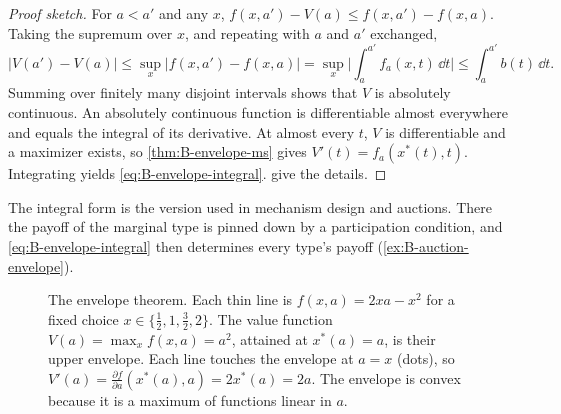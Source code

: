 \begin{proof}[Proof sketch]
For $a < a'$ and any $x$, $f(x, a') - V(a) \leq f(x, a') - f(x, a)$. Taking the supremum over $x$, and repeating with
$a$ and $a'$ exchanged,
\begin{equation*}
|V(a') - V(a)| \leq \sup_x|f(x, a') - f(x, a)| = \sup_x\Big|\int_a^{a'}f_a(x, t)\,\dd t\Big| \leq \int_a^{a'}b(t)\,\dd t .
\end{equation*}
Summing over finitely many disjoint intervals shows that $V$ is absolutely continuous. An absolutely continuous
function is differentiable almost everywhere and equals the integral of its derivative. At almost every $t$, $V$ is
differentiable and a maximizer exists, so \cref{thm:B-envelope-ms} gives $V'(t) = f_a(x^*(t), t)$. Integrating yields
\eqref{eq:B-envelope-integral}.  give the details.
\end{proof}

The integral form is the version used in mechanism design and auctions. There the payoff of the marginal type is
pinned down by a participation condition, and \eqref{eq:B-envelope-integral} then determines every type's payoff
(\cref{ex:B-auction-envelope}).

\begin{figure}[htbp]
\centering
{}
\caption{The envelope theorem. Each thin line is $f(x, a) = 2xa - x^2$ for a fixed choice $x \in \{\frac{1}{2}, 1, \frac{3}{2}, 2\}$.
The value function $V(a) = \max_x f(x, a) = a^2$, attained at $x^*(a) = a$, is their upper envelope. Each line touches the
envelope at $a = x$ (dots), so $V'(a) = \frac{\partial f}{\partial a}(x^*(a), a) = 2x^*(a) = 2a$. The envelope is convex because
it is a maximum of functions linear in $a$.}
\label{fig:B-envelope}
\end{figure}


